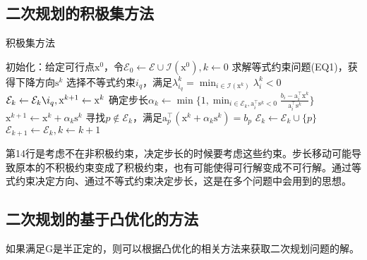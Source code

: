 \documentclass[a4paper]{D:/repositories/MyDGP/latex/PaperReadingLog}
\begin{document}
\subsection{二次规划的积极集方法}
\begin{algorithm}[H]
	\caption{积极集方法} 
	\begin{algorithmic}[1]
		\STATE 初始化：给定可行点$\mathrm{x}^0$，令$\mathcal{E}_0\leftarrow\mathcal{E}\cup\mathcal{I}(\mathrm{x}^0),k\leftarrow 0$
            \STATE 求解等式约束问题(EQ1)，获得下降方向$\mathrm{s}^k$
                    \STATE {}
                \ELSE
                    \STATE 选择不等式约束$i_q$，满足$\lambda_{i_q}^k=\min_{i\in\mathcal{I}(\mathrm{x}^k)}\lambda_i^k<0$
                    \STATE $\mathcal{E}_k\leftarrow\mathcal{E}_k\verb|\|{i_q},\mathrm{x}^{k+1}\leftarrow \mathrm{x}^k$
                \ENDIF
            \ELSE
                \STATE 确定步长$\alpha_k\leftarrow\min\{1,\min_{i\in\mathcal{E}_k,\mathrm{a}_i^\top \mathrm{s}^k<0}\frac{b_i-\mathrm{a}^\top_i\mathrm{x}^k}{\mathrm{a}_i^\top\mathrm{s}^k}\}$
                \STATE $\mathrm{x}^{k+1}\leftarrow \mathrm{x}^k+\alpha_k\mathrm{s}^k$
                    \STATE 寻找$p\notin\mathcal{E}_k$，满足$\mathrm{a}_p^\top(\mathrm{x}^k+\alpha_k\mathrm{s}^k)=b_p$
                    \STATE $\mathcal{E}_k\leftarrow \mathcal{E}_k\cup\{p\}$
                \ENDIF
            \ENDIF
            \STATE $\mathcal{E}_{k+1}\leftarrow \mathcal{E}_k,k\leftarrow k+1$
        \ENDWHILE
	\end{algorithmic}
\end{algorithm}

第14行是考虑不在非积极约束，决定步长的时候要考虑这些约束。步长移动可能导致原本的不积极约束变成了积极约束，也有可能使得可行解变成不可行解。通过等式约束决定方向、通过不等式约束决定步长，这是在多个问题中会用到的思想。

\subsection{二次规划的基于凸优化的方法}
如果满足$\mathrm{G}$是半正定的，则可以根据凸优化的相关方法来获取二次规划问题的解。
\end{document}
